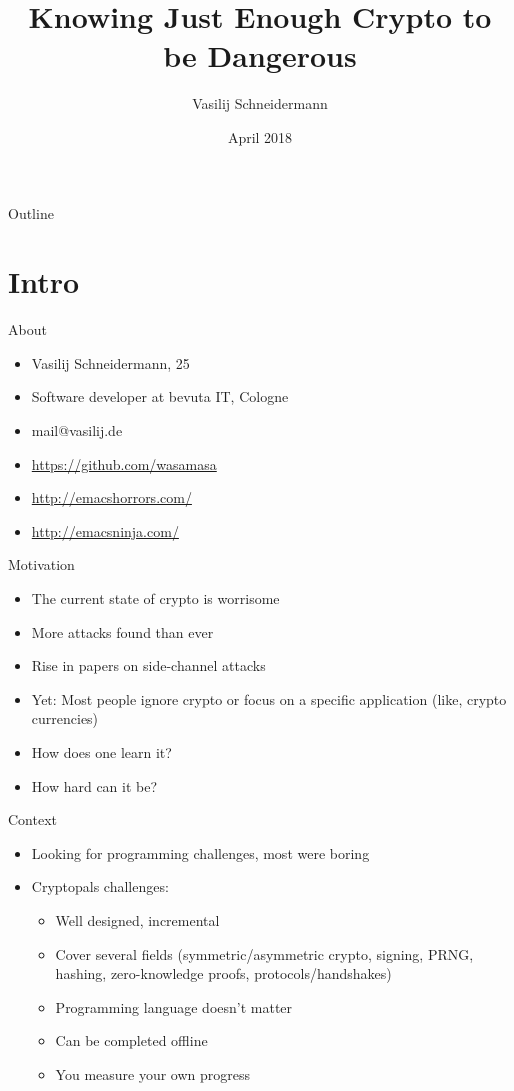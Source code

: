 \documentclass[presentation]{beamer}
\author{Vasilij Schneidermann}
\date{April 2018}
\title{Knowing Just Enough Crypto to be Dangerous}
\begin{document}
\maketitle
\begin{frame}{Outline}
\tableofcontents
\end{frame}

\AtBeginSection{\frame{\sectionpage}}

\section{Intro}
\label{sec-1}

\begin{frame}[label=sec-1-1]{About}
\begin{itemize}
\item Vasilij Schneidermann, 25
\item Software developer at bevuta IT, Cologne
\item mail@vasilij.de
\item \url{https://github.com/wasamasa}
\item \url{http://emacshorrors.com/}
\item \url{http://emacsninja.com/}
\end{itemize}
\end{frame}

\begin{frame}[label=sec-1-2]{Motivation}
\begin{itemize}
\item The current state of crypto is worrisome
\item More attacks found than ever
\item Rise in papers on side-channel attacks
\item Yet: Most people ignore crypto or focus on a specific application
(like, crypto currencies)
\item How does one learn it?
\item How hard can it be?
\end{itemize}
\end{frame}

\begin{frame}[label=sec-1-3]{Context}

\begin{itemize}
\item Looking for programming challenges, most were boring
\item Cryptopals challenges:
\begin{itemize}
\item Well designed, incremental
\item Cover several fields (symmetric/asymmetric crypto, signing, PRNG,
hashing, zero-knowledge proofs, protocols/handshakes)
\item Programming language doesn't matter
\item Can be completed offline
\item You measure your own progress
\end{itemize}
\end{itemize}
\end{frame}
\end{document}
